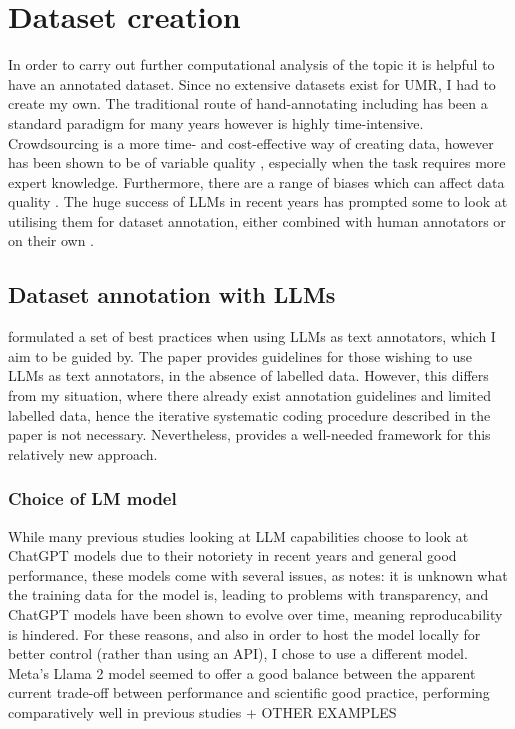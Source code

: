 \section{Dataset creation}
\label{sec:dataset_creation}
In order to carry out further computational analysis of the topic it is helpful to have an annotated dataset. Since no extensive datasets exist for UMR, I had to create my own. The traditional route of hand-annotating including has been a standard paradigm for many years however is highly time-intensive. Crowdsourcing is a more time- and cost-effective way of creating data, however has been shown to be of variable quality \citep{li2024comparative}, especially when the task requires more expert knowledge. Furthermore, there are a range of biases which can affect data quality \citep{Beck2023}. The huge success of LLMs in recent years has prompted some to look at utilising them for dataset annotation, either combined with human annotators \citep{goel2023llms} or on their own \citep{he2023annollm, llmsForPragAndDiscAnalysis, Gilardi_2023}.

\subsection{Dataset annotation with LLMs}
\citet{törnberg2024best} formulated a set of best practices when using LLMs as text annotators, which I aim to be guided by. The paper provides guidelines for those wishing to use LLMs as text annotators, in the absence of labelled data. However, this differs from my situation, where there already exist annotation guidelines and limited labelled data, hence the iterative systematic coding procedure described in the paper is not necessary. Nevertheless, \citet{törnberg2024best} provides a well-needed framework for this relatively new approach. 

\subsubsection*{Choice of LM model}
While many previous studies looking at LLM capabilities choose to look at ChatGPT models due to their notoriety in recent years and general good performance, these models come with several issues, as \citet{törnberg2024best} notes: it is unknown what the training data for the model is, leading to problems with transparency, and ChatGPT models have been shown to evolve over time, meaning reproducability is hindered. For these reasons, and also in order to host the model locally for better control (rather than using an API), I chose to use a different model. Meta's Llama 2 model \citep{touvron2023llama} seemed to offer a good balance between the apparent current trade-off between performance and scientific good practice, performing comparatively well in previous studies \citep{yuan2023futureTimeLlama} + OTHER EXAMPLES


